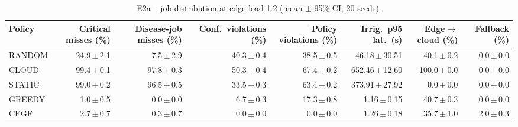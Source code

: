 \begin{table}[htbp]\scriptsize\centering
\caption{E2a -- job distribution at edge load 1.2 (mean $\pm$ 95\% CI, 20 seeds).}\label{tab:e2-1.2}
\begin{tabular}{lrrrrrrr}
\toprule
Policy & Critical misses (\%) & Disease-job misses (\%) & Conf.\ violations (\%) & Policy violations (\%) & Irrig.\ p95 lat.\ (s) & Edge$\to$cloud (\%) & Fallback (\%) \\
\midrule
RANDOM & 24.9\,$\pm$\,2.1 & 7.5\,$\pm$\,2.9 & 40.3\,$\pm$\,0.4 & 38.5\,$\pm$\,0.5 & 46.18\,$\pm$\,30.51 & 40.1\,$\pm$\,0.2 & 0.0\,$\pm$\,0.0 \\
CLOUD & 99.4\,$\pm$\,0.1 & 97.8\,$\pm$\,0.3 & 50.3\,$\pm$\,0.4 & 67.4\,$\pm$\,0.2 & 652.46\,$\pm$\,12.60 & 100.0\,$\pm$\,0.0 & 0.0\,$\pm$\,0.0 \\
STATIC & 99.0\,$\pm$\,0.2 & 96.5\,$\pm$\,0.5 & 33.5\,$\pm$\,0.3 & 63.4\,$\pm$\,0.2 & 373.91\,$\pm$\,27.92 & 0.0\,$\pm$\,0.0 & 0.0\,$\pm$\,0.0 \\
GREEDY & 1.0\,$\pm$\,0.5 & 0.0\,$\pm$\,0.0 & 6.7\,$\pm$\,0.3 & 17.3\,$\pm$\,0.8 & 1.16\,$\pm$\,0.15 & 40.7\,$\pm$\,0.3 & 0.0\,$\pm$\,0.0 \\
CEGF & 2.7\,$\pm$\,0.7 & 0.3\,$\pm$\,0.7 & 0.0\,$\pm$\,0.0 & 0.0\,$\pm$\,0.0 & 1.26\,$\pm$\,0.18 & 35.7\,$\pm$\,1.0 & 2.0\,$\pm$\,0.3 \\
\bottomrule
\end{tabular}
\end{table}